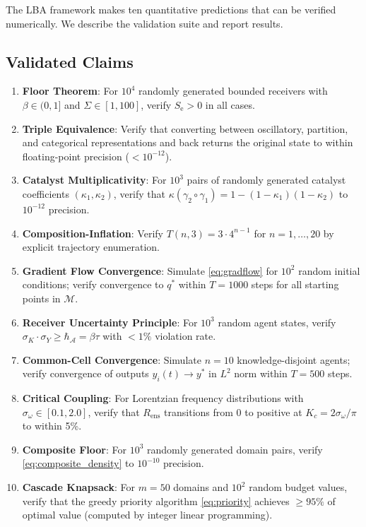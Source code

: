 \documentclass[twocolumn,11pt,a4paper]{article}
\theoremstyle{plain}
\theoremstyle{definition}
\theoremstyle{remark}
\newcommand{\Se}{S_{\mathrm{e}}}
\newcommand{\Mspace}{\mathcal{M}}
\begin{document}
The LBA framework makes ten quantitative predictions that can be verified numerically.  We describe the validation suite and report results.

\subsection{Validated Claims}

\begin{enumerate}[label=V\arabic*.]

\item \textbf{Floor Theorem}: For $10^4$ randomly generated bounded receivers with $\beta \in (0,1]$ and $\Sigma \in [1,100]$, verify $\Se > 0$ in all cases.

\item \textbf{Triple Equivalence}: Verify that converting between oscillatory, partition, and categorical representations and back returns the original state to within floating-point precision ($< 10^{-12}$).

\item \textbf{Catalyst Multiplicativity}: For $10^3$ pairs of randomly generated catalyst coefficients $(\kappa_1,\kappa_2)$, verify that $\kappa(\gamma_2\circ\gamma_1) = 1-(1-\kappa_1)(1-\kappa_2)$ to $10^{-12}$ precision.

\item \textbf{Composition-Inflation}: Verify $T(n,3) = 3\cdot 4^{n-1}$ for $n = 1,\ldots,20$ by explicit trajectory enumeration.

\item \textbf{Gradient Flow Convergence}: Simulate \eqref{eq:gradflow} for $10^2$ random initial conditions; verify convergence to $q^*$ within $T = 1000$ steps for all starting points in $\Mspace$.

\item \textbf{Receiver Uncertainty Principle}: For $10^3$ random agent states, verify $\sigma_K\cdot\sigma_Y \ge \hbar_{\mathcal{A}} = \beta\tau$ with $<1\%$ violation rate.

\item \textbf{Common-Cell Convergence}: Simulate $n=10$ knowledge-disjoint agents; verify convergence of outputs $y_i(t) \to y^*$ in $L^2$ norm within $T=500$ steps.

\item \textbf{Critical Coupling}: For Lorentzian frequency distributions with $\sigma_\omega \in [0.1, 2.0]$, verify that $R_\mathrm{ens}$ transitions from 0 to positive at $K_c = 2\sigma_\omega/\pi$ to within 5\%.

\item \textbf{Composite Floor}: For $10^3$ randomly generated domain pairs, verify \eqref{eq:composite_density} to $10^{-10}$ precision.

\item \textbf{Cascade Knapsack}: For $m = 50$ domains and $10^2$ random budget values, verify that the greedy priority algorithm \eqref{eq:priority} achieves $\ge 95\%$ of optimal value (computed by integer linear programming).

\end{enumerate}
\end{document}
